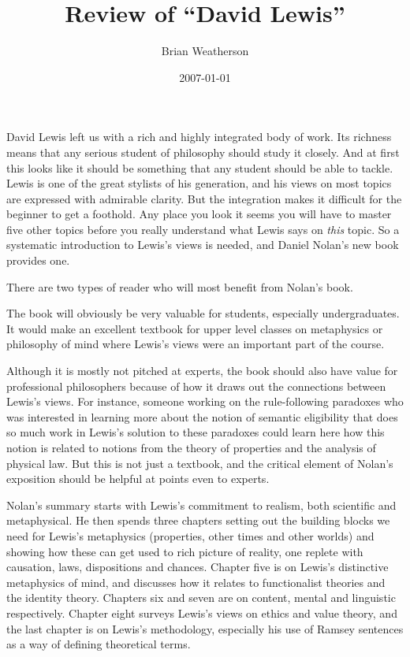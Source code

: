 \documentclass[
  11pt,
  letterpaper,
  DIV=11,
  numbers=noendperiod,
  oneside]{scrartcl}
\title{Review of ``David Lewis''}
\author{Brian Weatherson}
\date{2007-01-01}
\begin{document}
\maketitle
David Lewis left us with a rich and highly integrated body of work. Its
richness means that any serious student of philosophy should study it
closely. And at first this looks like it should be something that any
student should be able to tackle. Lewis is one of the great stylists of
his generation, and his views on most topics are expressed with
admirable clarity. But the integration makes it difficult for the
beginner to get a foothold. Any place you look it seems you will have to
master five other topics before you really understand what Lewis says on
\emph{this} topic. So a systematic introduction to Lewis's views is
needed, and Daniel Nolan's new book provides one.

There are two types of reader who will most benefit from Nolan's book.

The book will obviously be very valuable for students, especially
undergraduates. It would make an excellent textbook for upper level
classes on metaphysics or philosophy of mind where Lewis's views were an
important part of the course.

Although it is mostly not pitched at experts, the book should also have
value for professional philosophers because of how it draws out the
connections between Lewis's views. For instance, someone working on the
rule-following paradoxes who was interested in learning more about the
notion of semantic eligibility that does so much work in Lewis's
solution to these paradoxes could learn here how this notion is related
to notions from the theory of properties and the analysis of physical
law. But this is not just a textbook, and the critical element of
Nolan's exposition should be helpful at points even to experts.

Nolan's summary starts with Lewis's commitment to realism, both
scientific and metaphysical. He then spends three chapters setting out
the building blocks we need for Lewis's metaphysics (properties, other
times and other worlds) and showing how these can get used to rich
picture of reality, one replete with causation, laws, dispositions and
chances. Chapter five is on Lewis's distinctive metaphysics of mind, and
discusses how it relates to functionalist theories and the identity
theory. Chapters six and seven are on content, mental and linguistic
respectively. Chapter eight surveys Lewis's views on ethics and value
theory, and the last chapter is on Lewis's methodology, especially his
use of Ramsey sentences as a way of defining theoretical terms.
\end{document}
